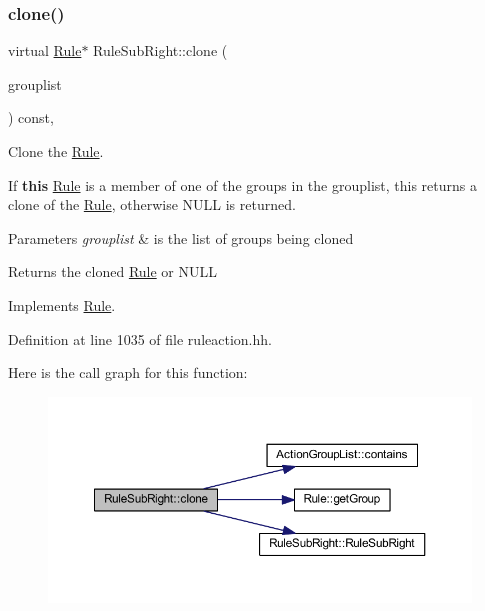 \subsubsection{\texorpdfstring{clone()}{clone()}}
{\footnotesize\ttfamily virtual \mbox{\hyperlink{class_rule}{Rule}}$\ast$ Rule\+Sub\+Right\+::clone (\begin{DoxyParamCaption}\item[{const \mbox{\hyperlink{class_action_group_list}{Action\+Group\+List}} \&}]{grouplist }\end{DoxyParamCaption}) const\hspace{0.3cm}{\ttfamily [inline]}, {\ttfamily [virtual]}}



Clone the \mbox{\hyperlink{class_rule}{Rule}}. 

If {\bfseries{this}} \mbox{\hyperlink{class_rule}{Rule}} is a member of one of the groups in the grouplist, this returns a clone of the \mbox{\hyperlink{class_rule}{Rule}}, otherwise N\+U\+LL is returned. 
\begin{DoxyParams}{Parameters}
{\em grouplist} & is the list of groups being cloned \\
\hline
\end{DoxyParams}
\begin{DoxyReturn}{Returns}
the cloned \mbox{\hyperlink{class_rule}{Rule}} or N\+U\+LL 
\end{DoxyReturn}


Implements \mbox{\hyperlink{class_rule_a70de90a76461bfa7ea0b575ce3c11e4d}{Rule}}.



Definition at line 1035 of file ruleaction.\+hh.

Here is the call graph for this function\+:
\nopagebreak
\begin{figure}[H]
\begin{center}
\leavevmode
\includegraphics[width=350pt]{class_rule_sub_right_afb228c3e1286d3fca825a105c0c85870_cgraph}
\end{center}
\end{figure}
\mbox{\label{class_rule_sub_right_a78d7843a5979bc62ba052f6031d1f49b}} 
